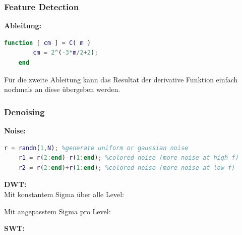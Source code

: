 \subsubsection{Feature Detection}
\textbf{Ableitung:}

\vspace{-0.4cm}

\begin{lstlisting}[language=Matlab]
	function [ cm ] = C( m )
		cm = 2^(-3*m/2+2);
	end
\end{lstlisting}



Für die zweite Ableitung kann das Resultat der derivative Funktion einfach nochmals an diese übergeben werden.



\subsubsection{Denoising}

\textbf{Noise:}

\vspace{-0.4cm}

\begin{lstlisting}[language=Matlab]
	r = randn(1,N); %generate uniform or gaussian noise
	r1 = r(2:end)-r(1:end); %colored noise (more noise at high f)
	r2 = r(2:end)+r(1:end); %colored noise (more noise at low f)
\end{lstlisting}

\textbf{DWT:}\\
Mit konstantem Sigma über alle Level:

\vspace{-0.4cm}



Mit angepasstem Sigma pro Level:

\vspace{-0.4cm}


\newpage


\newpage
\textbf{SWT:}

\vspace{-0.4cm}





